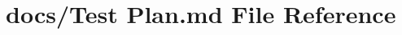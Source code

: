\hypertarget{_test_01_plan_8md}{}\section{docs/\+Test Plan.\+md File Reference}
\label{_test_01_plan_8md}

